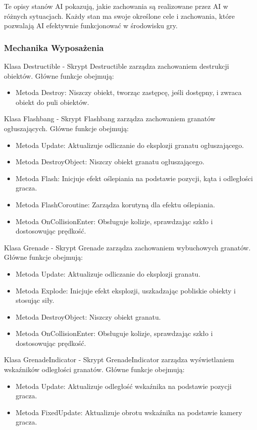 Te opisy stanów AI pokazują, jakie zachowania są realizowane przez AI w różnych sytuacjach. Każdy stan ma swoje określone cele i zachowania, które pozwalają AI efektywnie funkcjonować w środowisku gry.

\subsubsection{Mechanika Wyposażenia}

Klasa Destructible -
Skrypt Destructible zarządza zachowaniem destrukcji obiektów. Główne funkcje obejmują:
\begin{itemize}
  \item Metoda Destroy: Niszczy obiekt, tworząc zastępcę, jeśli dostępny, i zwraca obiekt do puli obiektów.
\end{itemize}

Klasa Flashbang -
Skrypt Flashbang zarządza zachowaniem granatów ogłuszających. Główne funkcje obejmują:
\begin{itemize}
  \item Metoda Update: Aktualizuje odliczanie do eksplozji granatu ogłuszającego.
  \item Metoda DestroyObject: Niszczy obiekt granatu ogłuszającego.
  \item Metoda Flash: Inicjuje efekt oślepiania na podstawie pozycji, kąta i odległości gracza.
  \item Metoda FlashCoroutine: Zarządza korutyną dla efektu oślepiania.
  \item Metoda OnCollisionEnter: Obsługuje kolizje, sprawdzając szkło i dostosowując prędkość.
\end{itemize}

Klasa Grenade -
Skrypt Grenade zarządza zachowaniem wybuchowych granatów. Główne funkcje obejmują:
\begin{itemize}
  \item Metoda Update: Aktualizuje odliczanie do eksplozji granatu.
  \item Metoda Explode: Inicjuje efekt eksplozji, uszkadzając pobliskie obiekty i stosując siły.
  \item Metoda DestroyObject: Niszczy obiekt granatu.
  \item Metoda OnCollisionEnter: Obsługuje kolizje, sprawdzając szkło i dostosowując prędkość.
\end{itemize}

Klasa GrenadeIndicator -
Skrypt GrenadeIndicator zarządza wyświetlaniem wskaźników odległości granatów. Główne funkcje obejmują:
\begin{itemize}
  \item Metoda Update: Aktualizuje odległość wskaźnika na podstawie pozycji gracza.
  \item Metoda FixedUpdate: Aktualizuje obrotu wskaźnika na podstawie kamery gracza.
\end{itemize}

